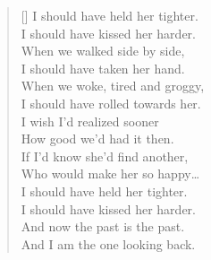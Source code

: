 \documentclass[12pt,oneside,openany]{memoir}
\newcommand{\attrib}[1]{%
\nopagebreak{\raggedleft\footnotesize #1\par}}
\begin{document}
\author{Noah Eisen}
\thispagestyle{empty}

\bigskip
\settowidth{\versewidth}{I should have roller towards her. blah blah blah}
\begin{verse}[\versewidth]
I should have held her tighter.\\
\vin I should have kissed her harder.\\
\bigskip
When we walked side by side,\\
\vin I should have taken her hand.\\
When we woke, tired and groggy,\\
\vin I should have rolled towards her.\\
\bigskip
I wish I’d realized sooner\\
\vin How good we’d had it then.\\
If I’d know she’d find another,\\
\vin Who would make her so happy\dots\\
\bigskip
I should have held her tighter.\\
\vin I should have kissed her harder.\\
\bigskip
And now the past is the past.\\
\vin And I am the one looking back.\\
\end{verse}
\attrib{Noah Eisen}
\end{document}
